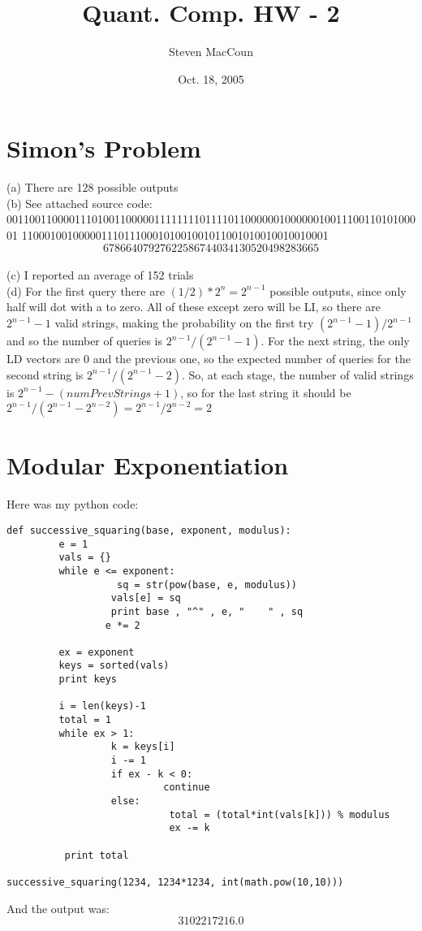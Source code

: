 \documentclass[12pt]{article}
\title{Quant. Comp. HW - 2}
\author{Steven MacCoun}
\date{Oct. 18, 2005}
\begin{document}
\maketitle						%



\section{Simon's Problem}

(a) There are 128 possible outputs
\\(b) See attached source code: \\00110011000011101001100000111111110111101100000010000001001110011010100001
110001001000001110111000101001001011001010010010010001
\[
\boxed{67866407927622586744034130520498283665}
\]
\\(c) I reported an average of 152 trials
\\(d) For the first query there are $(1/2)*2^n = 2^{n-1}$ possible outputs, since only half will dot with a to zero. All of these except zero will be LI, so there are $2^{n-1}-1$ valid strings, making the probability on the first try $(2^{n-1}-1)/2^{n-1}$ and so the number of queries is $2^{n-1}/(2^{n-1}-1)$. For the next string, the only LD vectors are 0 and the previous one, so  the expected number of queries for the second string is $2^{n-1}/(2^{n-1}-2)$. So, at each stage, the number of valid strings is $2^{n-1}-(numPrevStrings+1)$, so for the last string it should be $2^{n-1}/(2^{n-1}-2^{n-2}) = 2^{n-1}/2^{n-2}= 2$
\section{Modular Exponentiation}

Here was my python code:

\begin{verbatim}
def successive_squaring(base, exponent, modulus):
         e = 1
         vals = {}
         while e <= exponent:
                   sq = str(pow(base, e, modulus))
                  vals[e] = sq
                  print base , "^" , e, "    " , sq
                 e *= 2

         ex = exponent
         keys = sorted(vals)
         print keys
	
         i = len(keys)-1
         total = 1
         while ex > 1:
                  k = keys[i]
                  i -= 1
                  if ex - k < 0:
                           continue
                  else:
                            total = (total*int(vals[k])) % modulus
                            ex -= k

          print total

successive_squaring(1234, 1234*1234, int(math.pow(10,10)))
\end{verbatim}
And the output was: \[\boxed{3102217216.0}\] 
\end{document}
